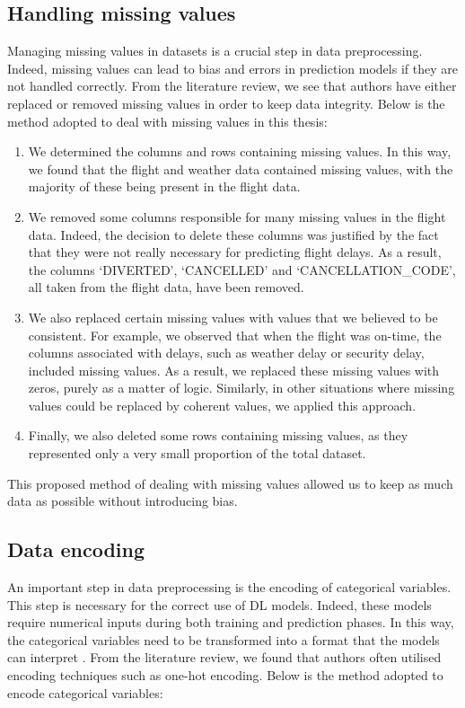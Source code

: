 \documentclass[12pt,oneside]{book} %
\begin{document}
\subsection{Handling missing values}

\noindent Managing missing values in datasets is a crucial step in data preprocessing. Indeed, missing values can lead to bias and errors in prediction models if they are not handled correctly. From the literature review, we see that authors have either replaced or removed missing values in order to keep data integrity. Below is the method adopted to deal with missing values in this thesis:

\begin{enumerate}
    \item We determined the columns and rows containing missing values. In this way, we found that the flight and weather data contained missing values, with the majority of these being present in the flight data.
    \item We removed some columns responsible for many missing values in the flight data. Indeed, the decision to delete these columns was justified by the fact that they were not really necessary for predicting flight delays. As a result, the columns `DIVERTED', `CANCELLED' and `CANCELLATION\_CODE', all taken from the flight data, have been removed.
    \item  We also replaced certain missing values with values that we believed to be consistent. For example, we observed that when the flight was on-time, the columns associated with delays, such as weather delay or security delay, included missing values. As a result, we replaced these missing values with zeros, purely as a matter of logic. Similarly, in other situations where missing values could be replaced by coherent values, we applied this approach.
    \item  Finally, we also deleted some rows containing missing values, as they represented only a very small proportion of the total dataset.
\end{enumerate}

\noindent This proposed method of dealing with missing values allowed us to keep as much data as possible without introducing bias.

\subsection{Data encoding}

\noindent An important step in data preprocessing is the encoding of categorical variables. This step is necessary for the correct use of DL models. Indeed, these models require numerical inputs during both training and prediction phases. In this way, the categorical variables need to be transformed into a format that the models can interpret \cite{Encoding}. From the literature review, we found that authors often utilised encoding techniques such as one-hot encoding. Below is the method adopted to encode categorical variables:
\end{document}
